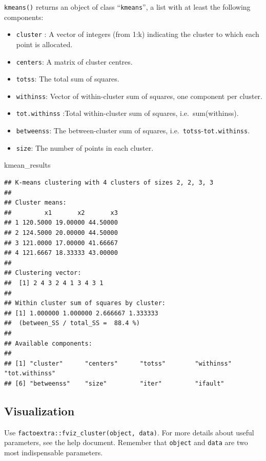 \documentclass[
]{ctexart}
\newenvironment{Shaded}{\begin{snugshade}}{\end{snugshade}}
\newcommand{\NormalTok}[1]{#1}
\providecommand{\tightlist}{%
  \setlength{\itemsep}{0pt}\setlength{\parskip}{0pt}}
\begin{document}
\texttt{kmeans()} returns an object of class ``\texttt{kmeans}'', a list
with at least the following components:

\begin{itemize}
\tightlist
\item
  \texttt{cluster} : A vector of integers (from 1:k) indicating the
  cluster to which each point is allocated.
\item
  \texttt{centers}: A matrix of cluster centres.
\item
  \texttt{totss}: The total sum of squares.
\item
  \texttt{withinss}: Vector of within-cluster sum of squares, one
  component per cluster.
\item
  \texttt{tot.withinss} :Total within-cluster sum of squares,
  i.e.~sum(withinss).
\item
  \texttt{betweenss}: The between-cluster sum of squares,
  i.e.~\texttt{totss}-\texttt{tot.withinss}.
\item
  \texttt{size}: The number of points in each cluster.
\end{itemize}

\begin{Shaded}
\begin{Highlighting}[]
\NormalTok{kmean\_results}
\end{Highlighting}
\end{Shaded}

\begin{verbatim}
## K-means clustering with 4 clusters of sizes 2, 2, 3, 3
## 
## Cluster means:
##         x1       x2       x3
## 1 120.5000 19.00000 44.50000
## 2 124.5000 20.00000 44.50000
## 3 121.0000 17.00000 41.66667
## 4 121.6667 18.33333 43.00000
## 
## Clustering vector:
##  [1] 2 4 3 2 4 1 3 4 3 1
## 
## Within cluster sum of squares by cluster:
## [1] 1.000000 1.000000 2.666667 1.333333
##  (between_SS / total_SS =  88.4 %)
## 
## Available components:
## 
## [1] "cluster"      "centers"      "totss"        "withinss"     "tot.withinss"
## [6] "betweenss"    "size"         "iter"         "ifault"
\end{verbatim}

\hypertarget{visualization-2}{%
\subsection{Visualization}\label{visualization-2}}

Use \texttt{factoextra::fviz\_cluster(object,\ data)}. For more details
about useful parameters, see the help document. Remember that
\texttt{object} and \texttt{data} are two most indispensable parameters.
\end{document}
